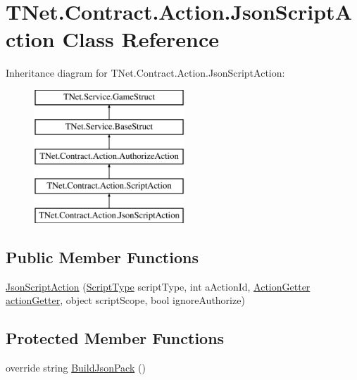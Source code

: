 \hypertarget{class_t_net_1_1_contract_1_1_action_1_1_json_script_action}{}\section{T\+Net.\+Contract.\+Action.\+Json\+Script\+Action Class Reference}
\label{class_t_net_1_1_contract_1_1_action_1_1_json_script_action}


 


Inheritance diagram for T\+Net.\+Contract.\+Action.\+Json\+Script\+Action\+:\begin{figure}[H]
\begin{center}
\leavevmode
\includegraphics[height=5.000000cm]{class_t_net_1_1_contract_1_1_action_1_1_json_script_action}
\end{center}
\end{figure}
\subsection*{Public Member Functions}
\begin{DoxyCompactItemize}
\item 
\mbox{\hyperlink{class_t_net_1_1_contract_1_1_action_1_1_json_script_action_a1242a3852fddcf417c12bd8024c58878}{Json\+Script\+Action}} (\mbox{\hyperlink{namespace_t_net_1_1_contract_1_1_action_a490a546f8f01a9b9305b8a0f8b98eded}{Script\+Type}} script\+Type, int a\+Action\+Id, \mbox{\hyperlink{class_t_net_1_1_service_1_1_action_getter}{Action\+Getter}} \mbox{\hyperlink{class_t_net_1_1_service_1_1_game_struct_a14dcf224eb5a73e2c0b3bee4fe359dd8}{action\+Getter}}, object script\+Scope, bool ignore\+Authorize)
\end{DoxyCompactItemize}
\subsection*{Protected Member Functions}
\begin{DoxyCompactItemize}
\item 
override string \mbox{\hyperlink{class_t_net_1_1_contract_1_1_action_1_1_json_script_action_a4bad6f9bab878db2b8ddc3a1d24d4b52}{Build\+Json\+Pack}} ()
\end{DoxyCompactItemize}
